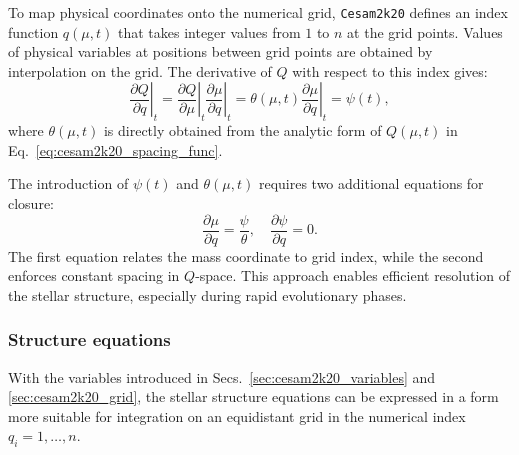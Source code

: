 \documentclass[12pt,a4paper]{article}
\newcommand{\pfird}[2][]{\frac{\partial#1}{\partial#2}}
\begin{document}
To map physical coordinates onto the numerical grid, \texttt{Cesam2k20} defines an index function $q(\mu, t)$ that takes integer values from $1$ to $n$ at the grid points. Values of physical variables at positions between grid points are obtained by interpolation on the grid. The derivative of $Q$ with respect to this index gives:
\begin{equation}
  \left.\pfird[Q]{q}\right|_t = \left.\pfird[Q]{\mu}\right|_t\left.\pfird[\mu]{q}\right|_t = \theta(\mu, t)\left.\pfird[\mu]{q}\right|_t = \psi(t),
\end{equation}
where $\theta(\mu, t)$ is directly obtained from the analytic form of $Q(\mu, t)$ in Eq.~\eqref{eq:cesam2k20_spacing_func}.

The introduction of $\psi(t)$ and $\theta(\mu, t)$ requires two additional equations for closure:
\begin{equation}
  \pfird[\mu]{q} = \frac{\psi}{\theta},\quad \pfird[\psi]{q} = 0.
\end{equation}
The first equation relates the mass coordinate to grid index, while the second enforces constant spacing in $Q$-space. This approach enables efficient resolution of the stellar structure, especially during rapid evolutionary phases.

\subsubsection{Structure equations}
\label{sec:cesam2k20_struct_eq}

With the variables introduced in Secs.~\ref{sec:cesam2k20_variables} and \ref{sec:cesam2k20_grid}, the stellar structure equations can be expressed in a form more suitable for integration on an equidistant grid in the numerical index $q_i = 1, \ldots, n$. 
\end{document}
